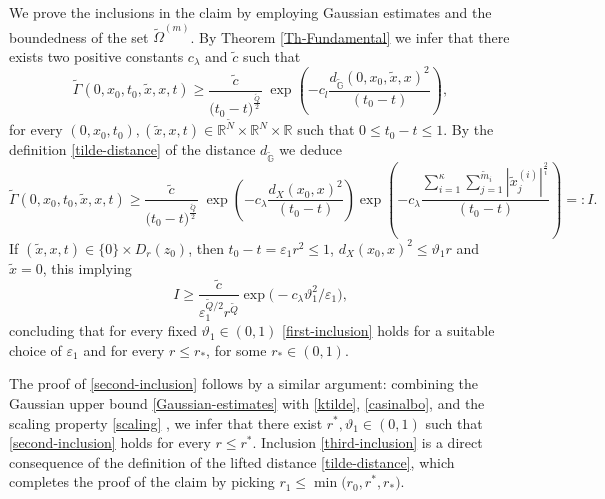 \documentclass[11pt,a4paper]{article}
\numberwithin{equation}{section}
\newcommand{\R}{\mathbb{R}}
\def \rn {{\mathbb {R}}^{N}}
\def \rnm {{\mathbb {R}}^{\tilde N}}
\def \tt {\tilde}
\def \GG {{\mathbb{G}}}
\def \ti {\times}
\def \G {{\Gamma}}
\def \e {{\varepsilon}}
\def \l {{\lambda}}
\def \O {{\Omega}}
\begin{document}
{{\begin{pf-parabolic-harnack}
	
	We prove the inclusions in the claim by employing Gaussian estimates and the boundedness of the set $\tt \O^{(m)}$. By Theorem \ref{Th-Fundamental} we infer that there exists two positive constants $c_\l$ and $\tt c$ such that 
	\begin{equation}
		\tt \G(0,x_0,t_0,\tt x, x,t)\geq \frac{\tilde c}{\big (t_0-t\big)^{\frac{\tt Q}{2}}} \;\exp{\left(-c_l\frac{d_{\tt\GG}(0,x_0,\tt x, x)^2}{(t_0-t)}\right)},
	\end{equation} 
	for every $(0,x_0,t_0),(\tt x,x,t)\in \rnm\ti\rn\ti \R$ such that $0\leq t_0-t\leq 1$. By the definition \eqref{tilde-distance}  of the distance $d_{\tt \GG}$ we deduce 
	\begin{equation}
		\tt \G(0,x_0,t_0,\tt x,x,t)\geq \frac{\tilde c}{\big (t_0-t\big)^{\frac{\tt Q}{2}}} \;\exp{\left(-c_\l\frac{d_X(x_0,x)^2}{(t_0-t)}\right)}\exp{\left(-c_\l\frac{\sum_{i=1}^\kappa \sum_{j=1}^{\tt m_i} |\tt x_j^{(i)}|^{\frac{2}{i}}}{(t_0-t)}\right)}=:I.
	\end{equation}
	If $(\tt x, x, t)\in \{0\}\ti D_r(z_0)$, then $t_0-t=\e_1r^2\leq 1$, $d_{X}(x_0,x)^2\leq \vartheta_1 r$ and $\tt x=0$, this implying
	\begin{equation}
		I\geq \frac{\tt c}{\e_1^{\tt Q/2} r^{\tt Q}}\exp{\Big(-c_\l\vartheta_1^2/\e_1\Big)},
	\end{equation}
	concluding that for every fixed $\vartheta_1\in(0,1)$ \eqref{first-inclusion} holds for a suitable choice of $\e_1$ and for every $r\leq r_*$, for some $r_*\in(0,1)$. 
	
	
	The proof of \eqref{second-inclusion} follows by a similar argument: combining the Gaussian upper bound \eqref{Gaussian-estimates} with \eqref{ktilde}, \eqref{casinalbo}, and the scaling property \eqref{scaling}
	, we infer that there exist $r^*,\vartheta_1\in(0,1)$ such that \eqref{second-inclusion} holds for every $r\leq r^*$. Inclusion  \eqref{third-inclusion} is a direct consequence of the definition of the lifted distance \eqref{tilde-distance}, which completes the proof of the claim by picking $r_1\leq \min\big(r_0,r^*,r_*\big)$.
\end{pf-parabolic-harnack}







}}
\end{document}
